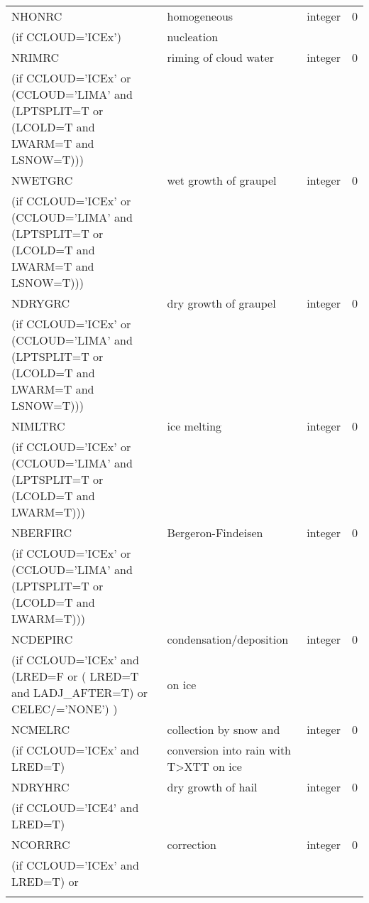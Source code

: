 \begin{longtable} {|p{}|p{}|>{\centering}p{}|p{}<{\centering}|}
NHONRC   & homogeneous   & integer  &  0 \index{NHONRC!\innam{NAM\_BU\_RRC}}\\ \nopagebreak
(if CCLOUD='ICEx') &nucleation &   &  \\\hline
NRIMRC   & riming of cloud water   & integer  &  0 \index{NRIMRC!\innam{NAM\_BU\_RRC}}\\ \nopagebreak
(if CCLOUD='ICEx' or (CCLOUD='LIMA' and (LPTSPLIT=T or (LCOLD=T and LWARM=T and LSNOW=T))) & & & \\\hline
NWETGRC   & wet growth of graupel  & integer  &  0 \index{NWETGRC!\innam{NAM\_BU\_RRC}}\\ \nopagebreak
(if CCLOUD='ICEx' or (CCLOUD='LIMA' and (LPTSPLIT=T or (LCOLD=T and LWARM=T and LSNOW=T))) & & & \\\hline
NDRYGRC   & dry growth of graupel & integer  &  0 \index{NDRYGRC!\innam{NAM\_BU\_RRC}}\\ \nopagebreak
(if CCLOUD='ICEx' or (CCLOUD='LIMA' and (LPTSPLIT=T or (LCOLD=T and LWARM=T and LSNOW=T))) & & & \\\hline
NIMLTRC   & ice melting & integer  &  0 \index{NIMLTRC!\innam{NAM\_BU\_RRC}}\\ \nopagebreak
(if CCLOUD='ICEx' or (CCLOUD='LIMA' and (LPTSPLIT=T or (LCOLD=T and LWARM=T))) & &   &  \\\hline
NBERFIRC  & Bergeron-Findeisen & integer  &  0 \index{NBERFIRC!\innam{NAM\_BU\_RRC}}\\ \nopagebreak
(if CCLOUD='ICEx' or (CCLOUD='LIMA' and (LPTSPLIT=T or (LCOLD=T and LWARM=T))) & &   &  \\\hline
NCDEPIRC  & condensation/deposition & integer  &  0 \index{NDEPIRC!\innam{NAM\_BU\_RRC}}\\ \nopagebreak
(if CCLOUD='ICEx' and (LRED=F or ( LRED=T and LADJ\_AFTER=T) or CELEC/='NONE')  ) &on ice &   &  \\\hline
NCMELRC  & collection by snow and  & integer  &  0 \index{NCMELRC!\innam{NAM\_BU\_RRC}}\\ \nopagebreak
(if CCLOUD='ICEx' and LRED=T) & conversion into rain with T>XTT on ice &   &  \\\hline
NDRYHRC  & dry growth of hail & integer  &  0 \index{NDRYHRC!\innam{NAM\_BU\_RRC}}\\ \nopagebreak
(if CCLOUD='ICE4' and LRED=T) & &   &  \\\hline
NCORRRC  & correction & integer  &  0 \index{NCORRRC!\innam{NAM\_BU\_RRC}}\\ \nopagebreak
(if CCLOUD='ICEx' and LRED=T) or & &   &  \\ \nopagebreak

\end{longtable}
